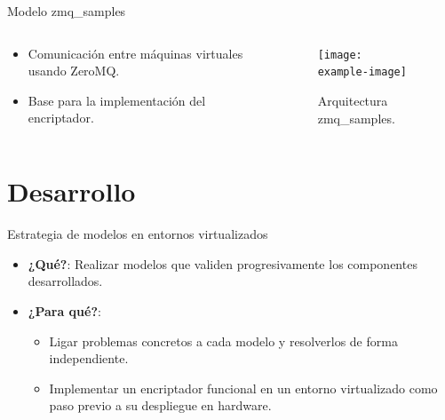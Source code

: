 \documentclass[serif, aspectratio=169]{beamer}
\begin{document}
\begin{frame}{Modelo zmq\_samples}
    \begin{columns}
        \begin{column}{0.5\textwidth}
            \begin{itemize}
                \item Comunicación entre máquinas virtuales usando ZeroMQ.
                \item Base para la implementación del encriptador.
            \end{itemize}
        \end{column}

        \begin{column}{0.5\textwidth}
            \begin{figure}
                \centering
                \texttt{[image: example-image]}
                \caption{\centering Arquitectura zmq\_samples.} 
            \end{figure}
        \end{column}
    \end{columns}
    
\end{frame}



\section{Desarrollo}

\begin{frame}{Estrategia de modelos en entornos virtualizados}
   \begin{itemize}
       \item \textbf{¿Qué?}: Realizar modelos que validen progresivamente los componentes desarrollados.
       \item \textbf{¿Para qué?}: 
       \begin{itemize}
        \item Ligar problemas concretos a cada modelo y resolverlos de forma independiente.
        \item Implementar un encriptador funcional en un entorno virtualizado como paso previo a su despliegue en hardware.
       \end{itemize}
       
   \end{itemize}
\end{frame}
\end{document}
